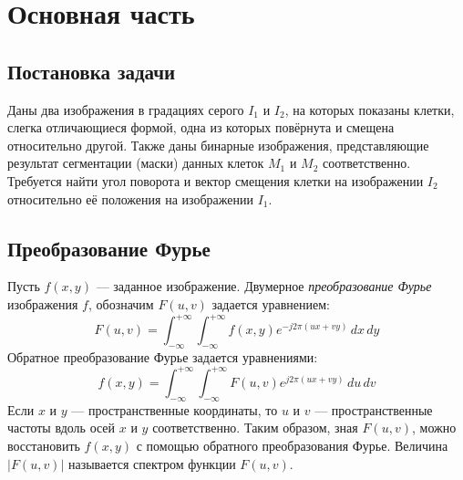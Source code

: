 \documentclass[oneside,final,14pt]{extreport}
\begin{document}
\chapter{Основная часть}
\section{Постановка задачи}
Даны два изображения в градациях серого \( I_\text{1} \) и \( I_\text{2} \), на которых показаны клетки, слегка отличающиеся формой, одна из которых повёрнута и смещена относительно другой. Также даны бинарные изображения, представляющие результат сегментации (маски) данных клеток \( M_\text{1} \) и \( M_\text{2} \) соответственно. Требуется найти угол поворота и вектор смещения клетки на изображении \( I_\text{2} \) относительно её положения на изображении \( I_\text{1} \).

\section{Преобразование Фурье}
Пусть \(f(x,y)\) --- заданное изображение. Двумерное \emph{преобразование Фурье} изображения \(f\), обозначим \(F(u,v)\) задается уравнением: \begin{equation} F(u,v) = \int_{-\infty}^{+\infty} \int_{-\infty}^{+\infty} f(x,y)e^{-j2\pi(ux + vy)}\,dx\,dy \end{equation} Обратное преобразование Фурье задается уравнениями:\begin{equation} f(x,y) = \int_{-\infty}^{+\infty} \int_{-\infty}^{+\infty} F(u,v)e^{j2\pi(ux + vy)}\,du\,dv \end{equation} Если \(x\) и \(y\) --- пространственные координаты, то \(u\) и \(v\) --- пространственные частоты вдоль осей \(x\) и \(y\) соответственно. Таким образом, зная \(F(u,v)\), можно восстановить \(f(x,y)\) с помощью обратного преобразования Фурье. Величина \(|F(u,v)|\) называется спектром функции \(F(u,v)\).
\end{document}
